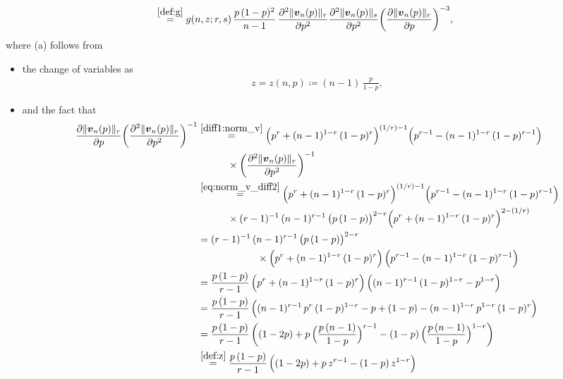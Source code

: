 \documentclass[conference, draftcls, onecolumn]{IEEEtran}
\theoremstyle{plain}
\newcommand{\bvec}[1]{\boldsymbol{#1}}
\newcommand{\lemref}[1]{Lemma~\ref{#1}}
\begin{document}
\begin{IEEEproof}[Proof of \lemref{lem:convex_v}]
\begin{align}
\\
& \overset{\eqref{def:g}}{=}
g(n, z; r, s) \, \frac{ p \, (1-p)^{2} }{ n-1 } \, \frac{ \partial^{2} \| \bvec{v}_{n}( p ) \|_{r} }{ \partial p^{2} } \frac{ \partial^{2} \| \bvec{v}_{n}( p ) \|_{s} }{ \partial p^{2} } \bigg( \frac{ \partial \| \bvec{v}_{n}( p ) \|_{r} }{ \partial p } \bigg)^{-3} ,
\label{eq:diff2_2norm_v}
\end{align}
where (a) follows from
\begin{itemize}
\item
the change of variables as
\begin{align}
z = z(n, p) \coloneqq (n-1) \, \frac{ p }{ 1-p } ,
\label{def:z}
\end{align}
\item
and the fact that
\begin{align}
\frac{ \partial \| \bvec{v}_{n}( p ) \|_{r} }{ \partial p } \bigg( \frac{ \partial^{2} \| \bvec{v}_{n}( p ) \|_{r} }{ \partial p^{2} } \bigg)^{-1}
& \overset{\eqref{diff1:norm_v}}{=}
\Big( p^{r} + (n-1)^{1-r} \, (1-p)^{r} \Big)^{(1/r)-1} \Big( p^{r-1} - (n-1)^{1-r} \, (1-p)^{r-1} \Big) \notag \\
& \qquad \quad \times
\bigg( \frac{ \partial^{2} \| \bvec{v}_{n}( p ) \|_{r} }{ \partial p^{2} } \bigg)^{-1}
\\
& \overset{\eqref{eq:norm_v_diff2}}{=}
\Big( p^{r} + (n-1)^{1-r} \, (1-p)^{r} \Big)^{(1/r)-1} \Big( p^{r-1} - (n-1)^{1-r} \, (1-p)^{r-1} \Big)
\notag \\
& \qquad \quad \times
(r-1)^{-1} \, (n-1)^{r-1} \, \big( p \, (1-p) \big)^{2-r} \Big( p^{r} + (n-1)^{1-r} \, (1-p)^{r} \Big)^{2-(1/r)}
\\
& =
(r-1)^{-1} \, (n-1)^{r-1} \, \big( p \, (1-p) \big)^{2-r}
\notag \\
& \qquad \qquad \qquad \times
\Big( p^{r} + (n-1)^{1-r} \, (1-p)^{r} \Big) \, \Big( p^{r-1} - (n-1)^{1-r} \, (1-p)^{r-1} \Big)
\\
& =
\frac{ p \, (1-p) }{ r - 1 } \, \Big( p^{r} + (n-1)^{1-r} \, (1-p)^{r} \Big) \, \Big( (n-1)^{r-1} \, (1-p)^{1-r} - p^{1-r} \Big)
\\
& =
\frac{ p \, (1-p) }{ r - 1 } \, \Big( (n-1)^{r-1} \, p^{r} \, (1-p)^{1-r} - p + (1-p) - (n-1)^{1-r} \, p^{1-r} \, (1-p)^{r} \Big)
\\
& =
\frac{ p \, (1-p) }{ r - 1 } \, \bigg( (1-2p) +  p \, \Big( \frac{ p \, (n-1) }{ 1-p } \Big)^{r-1} - (1-p) \, \Big( \frac{ p \, (n-1) }{ 1-p } \Big)^{1-r} \bigg)
\\
& \overset{\eqref{def:z}}{=}
\frac{ p \, (1-p) }{ r - 1 } \, \Big( (1-2p) +  p \, z^{r-1} - (1-p) \, z^{1-r} \Big)

\end{align}
\end{itemize}
\end{IEEEproof}
\end{document}
